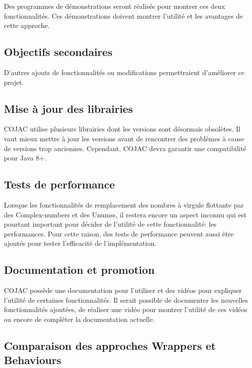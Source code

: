 Des programmes de démonstrations seront réalisés pour montrer ces deux fonctionnalités. Ces démonstrations doivent montrer l'utilité et les avantages de cette approche.

\begin{minipage2}
\section{Objectifs secondaires}

D'autres ajouts de fonctionnalités ou modifications permettraient d'améliorer ce projet.

\subsection{Mise à jour des librairies}

\gls{COJAC} utilise plusieurs librairies dont les versions sont désormais obsolètes. Il vaut mieux mettre à jour les versions avant de rencontrer des problèmes à cause de versions trop anciennes. Cependant, \gls{COJAC} devra garantir une compatibilité pour Java 8+.
\end{minipage2}

\subsection{Tests de performance}

Lorsque les fonctionnalités de remplacement des nombres à virgule flottante par des \glspl{Complex-number} et des \glspl{Unums}, il restera encore un aspect inconnu qui est pourtant important pour décider de l'utilité de cette fonctionnalité: les performances. Pour cette raison, des tests de performance peuvent aussi être ajoutés pour tester l'efficacité de l'implémentation.

\subsection{Documentation et promotion}

\gls{COJAC} possède une documentation pour l'utiliser et des vidéos pour expliquer l'utilité de certaines fonctionnalités. Il serait possible de documenter les nouvelles fonctionnalités ajoutées, de réaliser une vidéo pour montrer l'utilité de ces vidéos ou encore de compléter la documentation actuelle.

\subsection{Comparaison des approches Wrappers et Behaviours}

